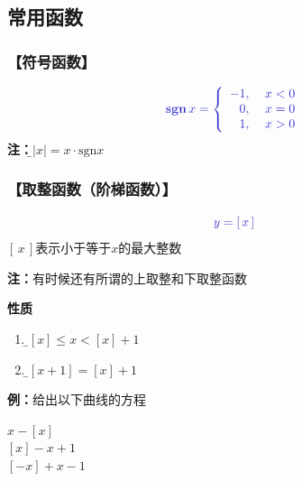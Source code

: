 \subsection{常用函数}

\subsubsection{【符号函数】}

  $${\b \bm{\mathrm{sgn}}\,x =\left\{
	\begin{array}{rl}
	-1,\;&x<0 \\
	0,\;&x=0 \\
	1,\;&x>0
	\end{array}
  \right.}$$
  {\bf 注：}{\b $|x|=x \cdot\mathrm{sgn} x$}
	

 \subsubsection{【取整函数（阶梯函数）】}

  $${\b y=\left[ \,x\, \right]}$$
  $[\,x\,]$表示小于等于$x$的最大整数

	
{\bf 注：}有时候还有所谓的上取整和下取整函数

{\bf 性质}
\begin{enumerate}[(1)]
  \setlength{\itemindent}{1cm}
  \item {\b $[x]\leq x<[x]+1$}
  \item {\b $[x+1]=[x]+1$}
\end{enumerate}

{{\bf 例：}给出以下曲线的方程}

\begin{center}
	\quad $x-[x]$\\

	\quad $[x]-x+1$\\

	\quad $[-x]+x-1$
\end{center}
	
